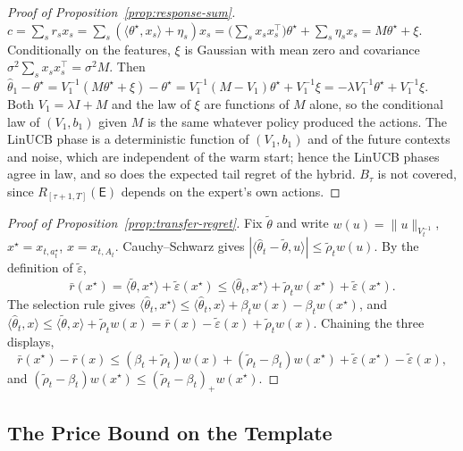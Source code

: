 \documentclass{article}
\theoremstyle{definition}
\theoremstyle{remark}
\theoremstyle{remark}
\newcommand{\Exp}{\mathsf{E}}
\newcommand{\wid}{w}
\begin{document}
\begin{proof}[Proof of Proposition~\ref{prop:response-sum}]
$c=\sum_sr_sx_s=\sum_s(\langle\theta^\star,x_s\rangle+\eta_s)x_s
=\bigl(\sum_sx_sx_s^\top\bigr)\theta^\star+\sum_s\eta_sx_s=M\theta^\star+\xi$.
Conditionally on the features, $\xi$ is Gaussian with mean zero and covariance
$\sigma^2\sum_sx_sx_s^\top=\sigma^2M$. Then
$\widehat\theta_1-\theta^\star=V_1^{-1}(M\theta^\star+\xi)-\theta^\star
=V_1^{-1}(M-V_1)\theta^\star+V_1^{-1}\xi=-\lambda V_1^{-1}\theta^\star+V_1^{-1}\xi$.
Both $V_1=\lambda I+M$ and the law of $\xi$ are functions of $M$ alone, so the
conditional law of $(V_1,b_1)$ given $M$ is the same whatever policy produced
the actions. The LinUCB phase is a deterministic function of $(V_1,b_1)$ and of
the future contexts and noise, which are independent of the warm start; hence
the LinUCB phases agree in law, and so does the expected tail regret of the
hybrid. $B_\tau$ is not covered, since $R_{[\tau+1,T]}(\Exp)$ depends on the
expert's own actions.
\end{proof}

\begin{proof}[Proof of Proposition~\ref{prop:transfer-regret}]
Fix $\widetilde\theta$ and write $\wid(u)=\|u\|_{V_t^{-1}}$,
$x^\star=x_{t,a^\star_t}$, $x=x_{t,A_t}$. Cauchy--Schwarz gives
$|\langle\widehat\theta_t-\widetilde\theta,u\rangle|\le\widetilde\rho_t\wid(u)$.
By the definition of $\widetilde\varepsilon$,
\[
\bar r(x^\star)=\langle\widetilde\theta,x^\star\rangle+\widetilde\varepsilon(x^\star)
\le\langle\widehat\theta_t,x^\star\rangle+\widetilde\rho_t\wid(x^\star)+\widetilde\varepsilon(x^\star).
\]
The selection rule gives
$\langle\widehat\theta_t,x^\star\rangle\le\langle\widehat\theta_t,x\rangle+\beta_t\wid(x)-\beta_t\wid(x^\star)$,
and
$\langle\widehat\theta_t,x\rangle\le\langle\widetilde\theta,x\rangle+\widetilde\rho_t\wid(x)
=\bar r(x)-\widetilde\varepsilon(x)+\widetilde\rho_t\wid(x)$.
Chaining the three displays,
\[
\bar r(x^\star)-\bar r(x)\le(\beta_t+\widetilde\rho_t)\wid(x)
+(\widetilde\rho_t-\beta_t)\wid(x^\star)
+\widetilde\varepsilon(x^\star)-\widetilde\varepsilon(x),
\]
and $(\widetilde\rho_t-\beta_t)\wid(x^\star)\le(\widetilde\rho_t-\beta_t)_+\wid(x^\star)$.
\end{proof}

\subsection{The Price Bound on the Template}
\label{app:price-template}
\end{document}
